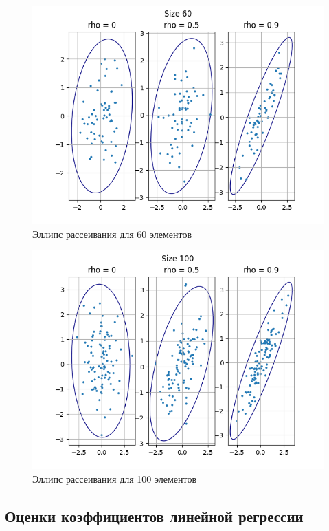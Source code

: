 \documentclass[a4paper,14pt]{article}
\begin{document}
	\begin{figure}[H]
		\centering
		\includegraphics[scale=0.85]{../image/lab5_60.png}
		\caption{Эллипс рассеивания для 60 элементов}
	\end{figure}
	
	\begin{figure}[H]
		\centering
		\includegraphics[scale=0.85]{../image/lab5_100.png}
		\caption{Эллипс рассеивания для 100 элементов}
	\end{figure}
	
	\subsection{Оценки коэффициентов линейной регрессии}
	
\end{document}
